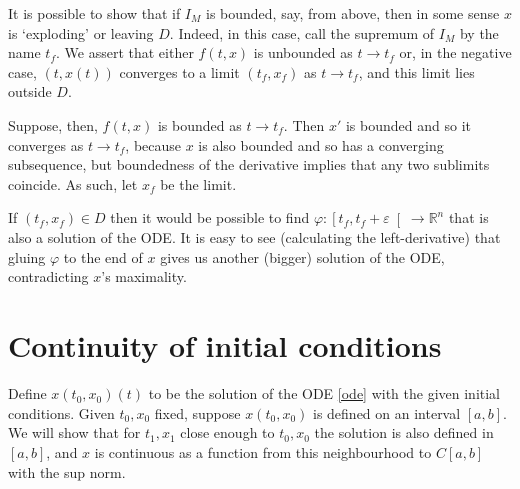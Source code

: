 \documentclass{article}
\newcommand{\R}{\mathbb{R}}
\begin{document}
It is possible to show that if $I_M$ is bounded, say, from above, then in some sense $x$ is `exploding' or leaving $D$. Indeed, in this case, call the supremum of $I_M$ by the name $t_f$. We assert that either $f(t, x)$ is unbounded as $t \to t_f$ or, in the negative case, $(t, x(t))$ converges to a limit $(t_f, x_f)$ as $t \to t_f$, and this limit lies outside $D$.

Suppose, then, $f(t,x)$ is bounded as $t \to t_f$. Then $x'$ is bounded and so it converges as $t \to t_f$, because $x$ is also bounded and so has a converging subsequence, but boundedness of the derivative implies that any two sublimits coincide. As such, let $x_f$ be the limit.

If $(t_f, x_f) \in D$ then it would be possible to find $\varphi : \left[t_f, t_f + \varepsilon\right[ \to \R^n$ that is also a solution of the ODE. It is easy to see (calculating the left-derivative) that gluing $\varphi$ to the end of $x$ gives us another (bigger) solution of the ODE, contradicting $x$'s maximality.

\section{Continuity of initial conditions}

Define $x(t_0, x_0)(t)$ to be the solution of the ODE \eqref{ode} with the given initial conditions. Given $t_0, x_0$ fixed, suppose $x(t_0, x_0)$ is defined on an interval $[a,b]$. We will show that for $t_1, x_1$ close enough to $t_0, x_0$ the solution is also defined in $[a,b]$, and $x$ is continuous as a function from this neighbourhood to $C[a,b]$ with the sup norm.
\end{document}
